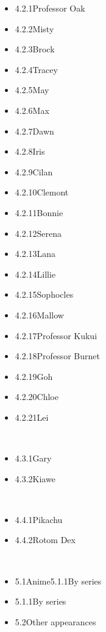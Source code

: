 \documentclass[a4paper,12pt]{article}
\begin{document}
\begin{itemize}
\item 4.2.1Professor Oak
\item 4.2.2Misty
\item 4.2.3Brock
\item 4.2.4Tracey
\item 4.2.5May
\item 4.2.6Max
\item 4.2.7Dawn
\item 4.2.8Iris
\item 4.2.9Cilan
\item 4.2.10Clemont
\item 4.2.11Bonnie
\item 4.2.12Serena
\item 4.2.13Lana
\item 4.2.14Lillie
\item 4.2.15Sophocles
\item 4.2.16Mallow
\item 4.2.17Professor Kukui
\item 4.2.18Professor Burnet
\item 4.2.19Goh
\item 4.2.20Chloe
\item 4.2.21Lei
\end{itemize}\\ \par \vspace{0.5cm}

\begin{itemize}
\item 4.3.1Gary
\item 4.3.2Kiawe
\end{itemize}\\ \par \vspace{0.5cm}

\begin{itemize}
\item 4.4.1Pikachu
\item 4.4.2Rotom Dex
\end{itemize}\\ \par \vspace{0.5cm}

\begin{itemize}
\item 5.1Anime5.1.1By series
\item 5.1.1By series
\item 5.2Other appearances
\end{itemize}\\ \par \vspace{0.5cm}
\end{document}
